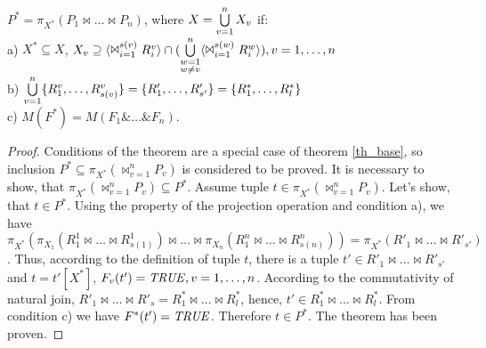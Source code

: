 \begin{theorem}
$P^{\ast} = \pi_{X^{\ast}} (P_1 \Join \dots \Join 
P_n)$, where $X = \bigcup\limits_{v=1}^{n} X_{v}$ if:
\\a) $X^{\ast} \subseteq X$, $X_v \supseteq \<\Join_{i=1}^{s(v)} R^v_i> \cap (\bigcup\limits_{\substack{w=1\\ w \neq v}}^{n} \<\Join_{i=1}^{s(w)} R^w_i> ), v = 1,\dots,n$
\\b)
$ \bigcup\limits_{v=1}^{n} \{R^{v}_{1}, \ldots, R^{v}_{s(v)}\} = \{R'_{1}, \ldots, R'_{s'}\}
= \{R^{\ast}_{1}, \ldots, R^{\ast}_{l}\} $
\\c) $M(F^{\ast}) = M(F_{1} \& \dots \& F_{n})$.
\label{th_mult_eq}
\end{theorem} 
\begin{proof}
Conditions of the theorem are a special case of theorem \ref{th_base}, so
inclusion  $P^{\ast} \subseteq \pi_{X^{\ast}} (\Join_{v=1}^{n} P_{v})$ is
considered to be proved. It is necessary to show, that $\pi_{X^{\ast}}
(\Join_{v=1}^{n} P_{v}) \subseteq P^{\ast}$. Assume tuple $t \in \pi_{X^{\ast}}
(\Join_{v=1}^{n} P_{v})$. Let's show, that $t \in P^{\ast}$. Using the property
of the projection operation and condition a), we have $\pi_{X^{\ast}}(\pi_{X_1}
(R^1_1 \Join \dots \Join R^1_{s(1)}) \Join \dots \Join \pi_{X_n}(R^n_1 \Join
\dots \Join R^n_{s(n)})) = \pi_{X^{\ast}} (R'_1 \Join \dots \Join R'_{s'})$.
Thus, according to the definition of tuple $t$, there is a tuple  $t' \in R'_1
\Join \ldots \Join R'_{s'}$ and $t = t'[X^{\ast}]$, $F_v(t')=\mathit{TRUE}, v =
1,\dots,n$. According to the commutativity of natural join, $R'_1 \Join \ldots \Join
R'_s = R^{\ast}_1 \Join \ldots \Join R^{\ast}_l$, hence, $t' \in R^{\ast}_1 \Join
\ldots \Join R^{\ast}_l$. From condition c) we have $F^{\ast} (t')=\mathit{TRUE}$.
Therefore $t \in P^{\ast}$. The theorem has been proven.
\end{proof} 
